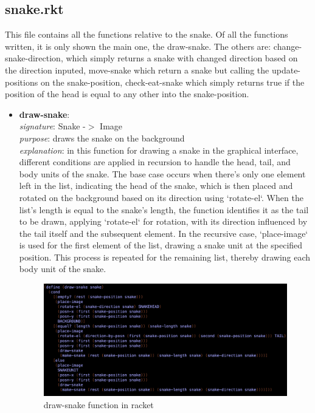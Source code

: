 \documentclass{article}
\begin{document}
	\subsection{snake.rkt}
	This file contains all the functions relative to the snake. Of all the functions written, it is only shown the main one, the draw-snake. The others are: change-snake-direction, which simply returns a snake with changed direction based on the direction inputed, move-snake which return a snake but calling the update-positions on the snake-position, check-eat-snake which simply returns true if the position of the head is equal to any other into the snake-position.
	\begin{itemize}
		\item \textbf{draw-snake}: \\
			\emph{signature}: Snake -$>$ Image \\
			\emph{purpose}: draws the snake on the background \\
			\emph{explanation}: in this function for drawing a snake in the graphical interface, different conditions are applied in recursion to handle the head, tail, and body units of the snake. The base case occurs when there's only one element left in the list, indicating the head of the snake, which is then placed and rotated on the background based on its direction using `rotate-el`. When the list's length is equal to the snake's length, the function identifies it as the tail to be drawn, applying `rotate-el` for rotation, with its direction influenced by the tail itself and the subsequent element. In the recursive case, `place-image` is used for the first element of the list, drawing a snake unit at the specified position. This process is repeated for the remaining list, thereby drawing each body unit of the snake.
			\begin{figure}[h!]
				\centering
				\includegraphics[width=.6\linewidth]{draw-snake.png}
				\caption{draw-snake function in racket}
			\end{figure}
	\end{itemize}
	
\end{document}
